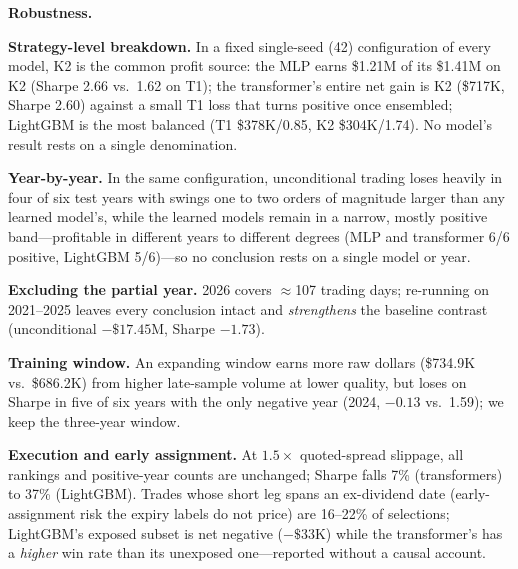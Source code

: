\documentclass[sigconf,review]{acmart}
\begin{document}
\medskip\noindent\textbf{Robustness.}
\label{sec:robustness}

\noindent\textbf{Strategy-level breakdown.} In a fixed single-seed (42) configuration of every model, K2 is the common profit source: the MLP earns \$1.21M of its \$1.41M on K2 (Sharpe 2.66 vs.\ 1.62 on T1); the transformer's entire net gain is K2 (\$717K, Sharpe 2.60) against a small T1 loss that turns positive once ensembled; LightGBM is the most balanced (T1 \$378K/0.85, K2 \$304K/1.74). No model's result rests on a single denomination.

\noindent\textbf{Year-by-year.} In the same configuration, unconditional trading loses heavily in four of six test years with swings one to two orders of magnitude larger than any learned model's, while the learned models remain in a narrow, mostly positive band---profitable in different years to different degrees (MLP and transformer 6/6 positive, LightGBM 5/6)---so no conclusion rests on a single model or year.

\noindent\textbf{Excluding the partial year.} 2026 covers $\approx$107 trading days; re-running on 2021--2025 leaves every conclusion intact and \emph{strengthens} the baseline contrast (unconditional $-\$17.45$M, Sharpe $-1.73$).

\noindent\textbf{Training window.} An expanding window earns more raw dollars (\$734.9K vs.\ \$686.2K) from higher late-sample volume at lower quality, but loses on Sharpe in five of six years with the only negative year (2024, $-0.13$ vs.\ 1.59); we keep the three-year window.

\noindent\textbf{Execution and early assignment.} At $1.5\times$ quoted-spread slippage, all rankings and positive-year counts are unchanged; Sharpe falls 7\% (transformers) to 37\% (LightGBM). Trades whose short leg spans an ex-dividend date (early-assignment risk the expiry labels do not price) are 16--22\% of selections; LightGBM's exposed subset is net negative ($-\$33$K) while the transformer's has a \emph{higher} win rate than its unexposed one---reported without a causal account.
\end{document}
